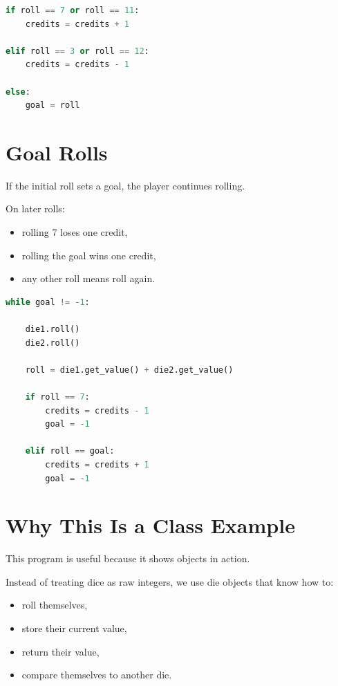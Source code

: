 \documentclass[11pt]{article}
\begin{document}
\begin{lstlisting}[language=Python]
if roll == 7 or roll == 11:
    credits = credits + 1

elif roll == 3 or roll == 12:
    credits = credits - 1

else:
    goal = roll
\end{lstlisting}

\section{Goal Rolls}

If the initial roll sets a goal, the player continues rolling.

On later rolls:

\begin{itemize}
    \item rolling 7 loses one credit,
    \item rolling the goal wins one credit,
    \item any other roll means roll again.
\end{itemize}

\begin{lstlisting}[language=Python]
while goal != -1:

    die1.roll()
    die2.roll()

    roll = die1.get_value() + die2.get_value()

    if roll == 7:
        credits = credits - 1
        goal = -1

    elif roll == goal:
        credits = credits + 1
        goal = -1
\end{lstlisting}

\section{Why This Is a Class Example}

This program is useful because it shows objects in action.

Instead of treating dice as raw integers, we use die objects that know how to:

\begin{itemize}
    \item roll themselves,
    \item store their current value,
    \item return their value,
    \item compare themselves to another die.
\end{itemize}
\end{document}

